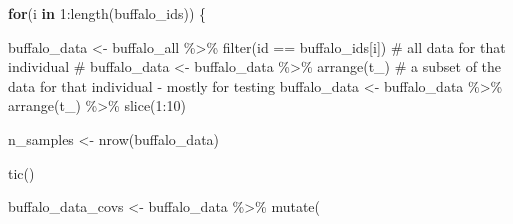 \documentclass[
  letterpaper,
  DIV=11,
  numbers=noendperiod]{scrartcl}
\newenvironment{Shaded}{\begin{snugshade}}{\end{snugshade}}
\newcommand{\CommentTok}[1]{\textcolor[rgb]{0.37,0.37,0.37}{#1}}
\newcommand{\ControlFlowTok}[1]{\textcolor[rgb]{0.00,0.23,0.31}{\textbf{#1}}}
\newcommand{\DecValTok}[1]{\textcolor[rgb]{0.68,0.00,0.00}{#1}}
\newcommand{\FunctionTok}[1]{\textcolor[rgb]{0.28,0.35,0.67}{#1}}
\newcommand{\NormalTok}[1]{\textcolor[rgb]{0.00,0.23,0.31}{#1}}
\newcommand{\OtherTok}[1]{\textcolor[rgb]{0.00,0.23,0.31}{#1}}
\newcommand{\SpecialCharTok}[1]{\textcolor[rgb]{0.37,0.37,0.37}{#1}}
\begin{document}
\begin{Shaded}
\begin{Highlighting}[]
\ControlFlowTok{for}\NormalTok{(i }\ControlFlowTok{in} \DecValTok{1}\SpecialCharTok{:}\FunctionTok{length}\NormalTok{(buffalo\_ids)) \{}

\NormalTok{  buffalo\_data }\OtherTok{\textless{}{-}}\NormalTok{ buffalo\_all }\SpecialCharTok{\%\textgreater{}\%} \FunctionTok{filter}\NormalTok{(id }\SpecialCharTok{==}\NormalTok{ buffalo\_ids[i])}
  \CommentTok{\# all data for that individual}
  \CommentTok{\# buffalo\_data \textless{}{-} buffalo\_data \%\textgreater{}\% arrange(t\_)}
  \CommentTok{\# a subset of the data for that individual {-} mostly for testing}
\NormalTok{  buffalo\_data }\OtherTok{\textless{}{-}}\NormalTok{ buffalo\_data }\SpecialCharTok{\%\textgreater{}\%} \FunctionTok{arrange}\NormalTok{(t\_) }\SpecialCharTok{\%\textgreater{}\%} \FunctionTok{slice}\NormalTok{(}\DecValTok{1}\SpecialCharTok{:}\DecValTok{10}\NormalTok{)}
  
\NormalTok{  n\_samples }\OtherTok{\textless{}{-}} \FunctionTok{nrow}\NormalTok{(buffalo\_data)}
  
  \FunctionTok{tic}\NormalTok{()}
  
\NormalTok{  buffalo\_data\_covs }\OtherTok{\textless{}{-}}\NormalTok{ buffalo\_data }\SpecialCharTok{\%\textgreater{}\%} \FunctionTok{mutate}\NormalTok{(}
    

\end{Highlighting}
\end{Shaded}
\end{document}
